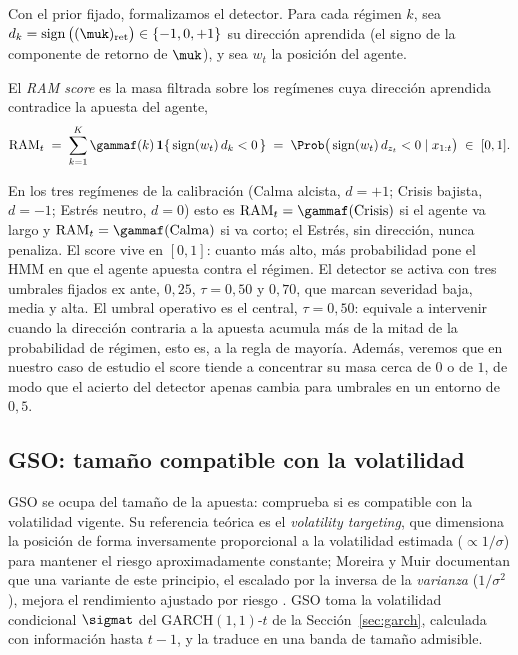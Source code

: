Con el prior fijado, formalizamos el detector. Para cada régimen $k$, sea $d_k = \operatorname{sign}\big((\muk)_{\mathrm{ret}}\big) \in \{-1, 0, +1\}$ su dirección aprendida (el signo de la componente de retorno de $\muk$), y sea $w_t$ la posición del agente.

\begin{definicion}
\label{def:ram}
El \emph{RAM score} es la masa filtrada sobre los regímenes cuya dirección aprendida contradice la apuesta del agente,
\[
\mathrm{RAM}_t \;=\; \sum_{k=1}^{K} \gammaf(k)\, \mathbf{1}\{\, \operatorname{sign}(w_t)\, d_k < 0 \,\} \;=\; \Prob\big(\operatorname{sign}(w_t)\, d_{z_t} < 0 \mid x_{1:t}\big) \;\in\; [0,1].
\]
\end{definicion}

En los tres regímenes de la calibración (Calma alcista, $d=+1$; Crisis bajista, $d=-1$; Estrés neutro, $d=0$) esto es $\mathrm{RAM}_t = \gammaf(\text{Crisis})$ si el agente va largo y $\mathrm{RAM}_t = \gammaf(\text{Calma})$ si va corto; el Estrés, sin dirección, nunca penaliza. El score vive en $[0,1]$: cuanto más alto, más probabilidad pone el HMM en que el agente apuesta contra el régimen. El detector se activa con tres umbrales fijados ex ante, $0{,}25$, $\tau = 0{,}50$ y $0{,}70$, que marcan severidad baja, media y alta. El umbral operativo es el central, $\tau = 0{,}50$: equivale a intervenir cuando la dirección contraria a la apuesta acumula más de la mitad de la probabilidad de régimen, esto es, a la regla de mayoría. Además, veremos que en nuestro caso de estudio el score tiende a concentrar su masa cerca de $0$ o de $1$, de modo que el acierto del detector apenas cambia para umbrales en un entorno de $0{,}5$.

\subsection{GSO: tamaño compatible con la volatilidad}
\label{sec:strata-gso}

GSO se ocupa del tamaño de la apuesta: comprueba si es compatible con la volatilidad vigente. Su referencia teórica es el \emph{volatility targeting}, que dimensiona la posición de forma inversamente proporcional a la volatilidad estimada ($\propto 1/\sigma$) para mantener el riesgo aproximadamente constante; Moreira y Muir documentan que una variante de este principio, el escalado por la inversa de la \emph{varianza} ($1/\sigma^2$), mejora el rendimiento ajustado por riesgo \cite{moreira2017}. GSO toma la volatilidad condicional $\sigmat$ del GARCH$(1,1)$-$t$ de la Sección~\ref{sec:garch}, calculada con información hasta $t-1$, y la traduce en una banda de tamaño admisible.

